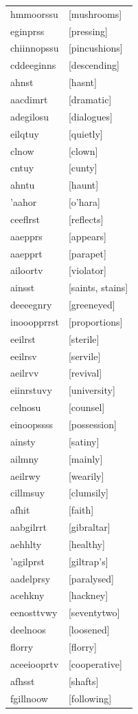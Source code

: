 \documentclass{article}
\begin{document}
\begin{tabular}{ll}
hmmoorssu & [mushrooms] \\
eginprss & [pressing] \\
chiinnopssu & [pincushions] \\
cddeeginns & [descending] \\
ahnst & [hasnt] \\
aacdimrt & [dramatic] \\
adegilosu & [dialogues] \\
eilqtuy & [quietly] \\
clnow & [clown] \\
cntuy & [cunty] \\
ahntu & [haunt] \\
'aahor & [o'hara] \\
ceeflrst & [reflects] \\
aaepprs & [appears] \\
aaepprt & [parapet] \\
ailoortv & [violator] \\
ainsst & [saints, stains] \\
deeeegnry & [greeneyed] \\
inooopprrst & [proportions] \\
eeilrst & [sterile] \\
eeilrsv & [servile] \\
aeilrvv & [revival] \\
eiinrstuvy & [university] \\
celnosu & [counsel] \\
einoopssss & [possession] \\
ainsty & [satiny] \\
ailmny & [mainly] \\
aeilrwy & [wearily] \\
cillmsuy & [clumsily] \\
afhit & [faith] \\
aabgilrrt & [gibraltar] \\
aehhlty & [healthy] \\
'agilprst & [giltrap's] \\
aadelprsy & [paralysed] \\
acehkny & [hackney] \\
eenosttvwy & [seventytwo] \\
deelnoos & [loosened] \\
florry & [florry] \\
aceeiooprtv & [cooperative] \\
afhsst & [shafts] \\
fgillnoow & [following] \\

\end{tabular}
\end{document}

